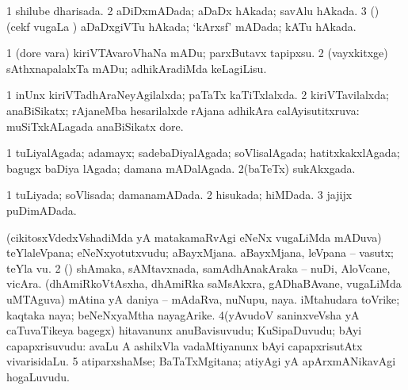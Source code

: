 \bentry
{} 
\gl{\gu}
\expl{}
\bmng
\bnum
\num{1} shilube dharisada. 
\num{2} aDiDxmADada; aDaDx hAkada; savAlu hAkada. 
\num{3} (\birx) (cekf \mo vugaLa \vi) aDaDxgiVTu hAkada; `kArxsf' mADada; kATu hAkada. 
\enum
\emng
\eentry

\bentry
{} 
\gl{\sakirx}
\expl{}
\bmng
\bnum
\num{1} (dore \mo vara) kiriVTAvaroVhaNa mADu; parxButavx tapipxsu. 
\num{2} (vayxkitxge) sAthxnapalalxTa mADu; adhikAradiMda keLagiLisu. 
\enum
\emng
\eentry

\bentry
{} 
\gl{\gu}
\expl{}
\bmng
\bnum
\num{1} inUnx kiriVTadhAraNeyAgilalxda; paTaTx kaTiTxlalxda. 
\num{2} kiriVTavilalxda; anaBiSikatx; rAjaneMba hesarilalxde rAjana adhikAra calAyisutitxruva:  muSiTxkALagada anaBiSikatx dore. 
\enum
\emng
\eentry

\bentry
{} 
\gl{\gu}
\expl{}
\bmng
\bnum
\num{1} tuLiyalAgada; adamayx; sadebaDiyalAgada; soVlisalAgada; hatitxkakxlAgada; bagugx baDiya lAgada; damana mADalAgada. 
\num{2}(baTeTx) sukAkxgada. 
\enum
\emng
\eentry

\bentry
{} 
\gl{\gu}
\expl{}
\bmng
\bnum
\num{1} tuLiyada; soVlisada; damanamADada. 
\num{2} hisukada; hiMDada. 
\num{3} jajijx puDimADada. 
\enum
\emng
\eentry

\bentry
{}
\gl{\saMkiSx}
\expl{}
\bmng
\emng
\eentry

\bentry
{}
\gl{\saMkiSx}
\expl{}
\bmng
\emng
\eentry

\bentry
{} 
\gl{\nA}
\expl{}
\bmng
\bnum
{} 
\banum
{} (cikitosxVdedxVshadiMda yA matakamaRvAgi eNeNx \mo vugaLiMda mADuva) teYlaleVpana; eNeNxyotutxvudu; aBayxMjana. 
 aBayxMjana, leVpana -- vasutx; teYla \mo vu. 
\eanum
\numie
\num{2} (\rUpa) shAmaka, sAMtavxnada, samAdhAnakAraka -- nuDi, AloVcane, vicAra. 
\banum
{}(dhAmiRkoVtAsxha, dhAmiRka saMsAkxra, gADhaBAvane, \mo vugaLiMda uMTAguva) mAtina yA daniya -- mAdaRva, nuNupu, naya. 
 iMtahudara toVrike; kaqtaka naya; beNeNxyaMtha nayagArike. 
\eanum
\numie
\num{4}(yAvudoV saninxveVsha yA caTuvaTikeya bagegx) hitavanunx anuBavisuvudu; KuSipaDuvudu; bAyi capapxrisuvudu:  avaLu A ashilxVla vadaMtiyanunx bAyi capapxrisutAtx vivarisidaLu. 
\num{5} atiparxshaMse; BaTaTxMgitana; atiyAgi yA apArxmANikavAgi hogaLuvudu. 
\enum
\emng
\eentry

